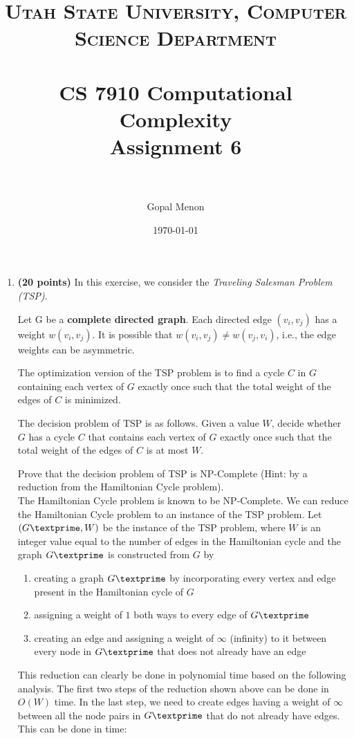 \documentclass[paper=a4, fontsize=11pt]{scrartcl} %
\title{	
\normalfont \normalsize 
\textsc{Utah State University, Computer Science Department} \\ [25pt] %
\horrule{0.5pt} \\[0.4cm] %
\huge CS 7910 Computational Complexity\\Assignment 6 \\ %
\horrule{2pt} \\[0.5cm] %
}
\author{Gopal Menon} %
\date{\normalsize\today} %
\numberwithin{equation}{section} %
\numberwithin{figure}{section} %
\numberwithin{table}{section} %
\begin{document}
\maketitle %

\begin{enumerate}
\item \textbf{(20 points)} In this exercise, we consider the \emph{Traveling Salesman Problem (TSP)}.

Let G be a \textbf{complete directed graph}. Each directed edge $(v_i,v_j)$ has a weight $w(v_i,v_j)$. It is possible that $w(v_i,v_j) \neq w(v_j,v_i)$, i.e., the edge weights can be asymmetric.

The optimization version of the TSP problem is to find a cycle $C$ in $G$ containing each vertex of $G$ exactly once such that the total weight of the edges of $C$ is minimized.

The decision problem of TSP is as follows. Given a value $W$, decide whether $G$ has a cycle $C$ that contains each vertex of $G$ exactly once such that the total weight of the edges of $C$ is at most $W$.

Prove that the decision problem of TSP is NP-Complete (Hint: by a reduction from the Hamiltonian Cycle problem).\\

The Hamiltonian Cycle problem is known to be NP-Complete. We can reduce the Hamiltonian Cycle problem to an instance of the TSP problem. Let $(G\textprime, W)$ be the instance of the TSP problem, where $W$ is an integer value equal to the number of edges in the Hamiltonian cycle and the graph $G\textprime$ is constructed from $G$ by 
\begin{enumerate}
\item creating a graph $G\textprime$ by incorporating every vertex and edge present in the Hamiltonian cycle of $G$
\item assigning a weight of $1$ both ways to every edge of $G\textprime$ 
\item creating an edge and assigning a weight of $\infty$ (infinity) to it between every node in $G\textprime$ that does not already have an edge
\end{enumerate} 

This reduction can clearly be done in polynomial time based on the following analysis. The first two steps of the reduction shown above can be done in $O(W)$ time. In the last step, we need to create edges having a weight of $\infty$ between all the node pairs in $G\textprime$ that do not already have edges. This can be done in time:


\end{enumerate}
\end{document}
